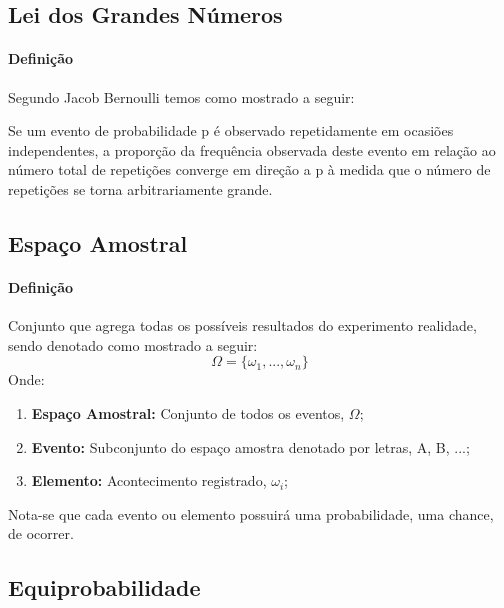 \documentclass{article}
\begin{document}
        \subsection{Lei dos Grandes Números}
            \paragraph{Definição}Segundo Jacob Bernoulli temos como mostrado a seguir:
                \begin{displayquote}[][]
                    Se um evento de probabilidade p é observado repetidamente em ocasiões independentes, a proporção da frequência observada deste evento em relação ao número total de repetições converge em direção a p à medida que o número de repetições se torna arbitrariamente grande.
                \end{displayquote}

        \subsection{Espaço Amostral}
            \paragraph{Definição}Conjunto que agrega todas os possíveis resultados do experimento realidade, sendo denotado como mostrado a seguir:
                \begin{equation}
                    \boxed{
                        \Omega = \{\omega_{1}, ... , \omega_{n} \}
                    }
                \end{equation}
            Onde:
                \begin{enumerate}[noitemsep]
                    \item \textbf{Espaço Amostral:} Conjunto de todos os eventos, $\Omega$;
                    \item \textbf{Evento:} Subconjunto do espaço amostra denotado por letras, A, B, ...;
                    \item \textbf{Elemento:} Acontecimento registrado, $\omega_{i}$;
                \end{enumerate}
            Nota-se que cada evento ou elemento possuirá uma probabilidade, uma chance, de ocorrer.

        \subsection{Equiprobabilidade}
\end{document}
